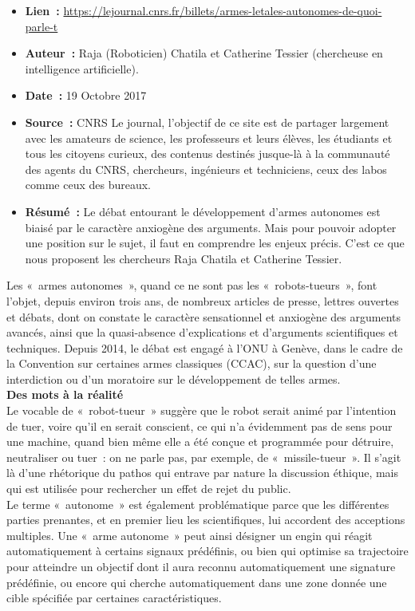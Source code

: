 \documentclass[8pt]{article}
\begin{document}
\begin{itemize}
	\setlength\itemsep{-0.25em}
	\item \textbf{Lien~: }  \url{https://lejournal.cnrs.fr/billets/armes-letales-autonomes-de-quoi-parle-t} 
	\item \textbf{Auteur~: } Raja (Roboticien) Chatila et Catherine Tessier (chercheuse en intelligence artificielle). 
	\item \textbf{Date~: }  19 Octobre 2017
	\item \textbf{Source~: } CNRS Le journal, l'objectif de ce site est de partager largement avec les amateurs de science, les professeurs et leurs élèves, les étudiants et tous les citoyens curieux, des contenus destinés jusque-là à la communauté des agents du CNRS, chercheurs, ingénieurs et techniciens, ceux des labos comme ceux des bureaux.
	\item \textbf{Résumé~: }
	Le débat entourant le développement d’armes autonomes est biaisé par le caractère anxiogène des arguments. Mais pour pouvoir adopter une position sur le sujet, il faut en comprendre les enjeux précis. C’est ce que nous proposent les chercheurs Raja Chatila et Catherine Tessier. 
\end{itemize}

Les «~armes autonomes~», quand ce ne sont pas les «~robots-tueurs~», font l’objet, depuis environ trois ans, de nombreux articles de presse, lettres ouvertes et débats, dont on constate le caractère sensationnel et anxiogène des arguments avancés, ainsi que la quasi-absence d’explications et d’arguments scientifiques et techniques. Depuis 2014, le débat est engagé à l’ONU à Genève, dans le cadre de la Convention sur certaines armes classiques (CCAC), sur la question d’une interdiction ou d’un moratoire sur le développement de telles armes.\\

\textbf{Des mots à la réalité}\\

Le vocable de «~robot-tueur~» suggère que le robot serait animé par l’intention de tuer, voire qu’il en serait conscient, ce qui n’a évidemment pas de sens pour une machine, quand bien même elle a été conçue et programmée pour détruire, neutraliser ou tuer~: on ne parle pas, par exemple, de «~missile-tueur~». Il s’agit là d’une rhétorique du pathos qui entrave par nature la discussion éthique, mais qui est utilisée pour rechercher un effet de rejet du public.\\

Le terme «~autonome~» est également problématique parce que les différentes parties prenantes, et en premier lieu les scientifiques, lui accordent des acceptions multiples. Une «~arme autonome~» peut ainsi désigner un engin qui réagit automatiquement à certains signaux prédéfinis, ou bien qui optimise sa trajectoire pour atteindre un objectif dont il aura reconnu automatiquement une signature prédéfinie, ou encore qui cherche automatiquement dans une zone donnée une cible spécifiée par certaines caractéristiques.\\
\end{document}
